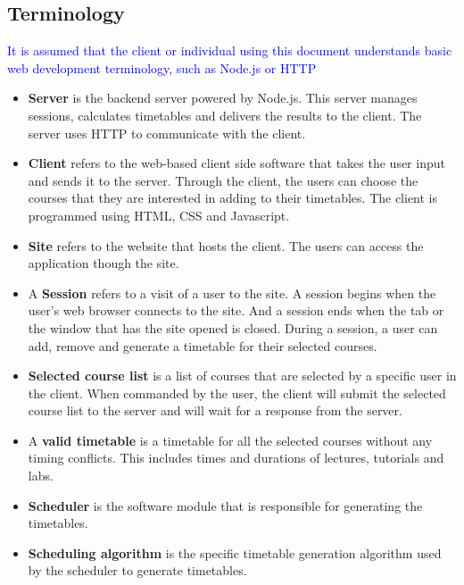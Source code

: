 \documentclass[12pt]{article}
\begin{document}
\subsection{Terminology}
\textcolor{blue}{It is assumed that the client or individual using this document understands basic web development terminology, such as Node.js or HTTP}
\begin{itemize}
  \item \textbf{Server} is the backend server powered by Node.js. This server manages sessions, calculates timetables and delivers the results to the client. The server uses HTTP to communicate with the client.
  
  \item \textbf{Client} refers to the web-based client side software that takes the user input and sends it to the server. Through the client, the users can choose the courses that they are interested in adding to their timetables. The client is programmed using HTML, CSS and Javascript.
  
  \item \textbf{Site} refers to the website that hosts the client. The users can access the application though the site.
  
  \item A \textbf{Session} refers to a visit of a user to the site. A session begins when the user's web browser connects to the site. And a session ends when the tab or the window that has the site opened is closed. During a session, a user can add, remove and generate a timetable for their selected courses.
  
  \item \textbf{Selected course list} is a list of courses that are selected by a specific user in the client. When commanded by the user, the client will submit the selected course list to the server and will wait for a response from the server.
  
  \item A \textbf{valid timetable} is a timetable for all the selected courses without any timing conflicts. This includes times and durations of lectures, tutorials and labs.
  
  \item \textbf{Scheduler} is the software module that is responsible for generating the timetables.
  
  \item \textbf{Scheduling algorithm} is the specific timetable generation algorithm used by the scheduler to generate timetables.
\end{itemize}
\end{document}
